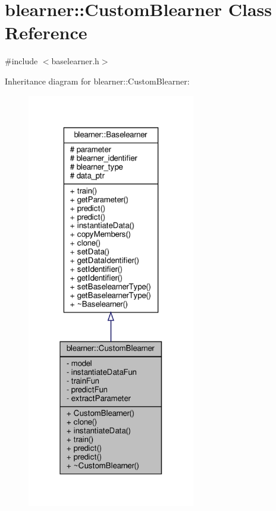 \hypertarget{classblearner_1_1_custom_blearner}{}\section{blearner\+:\+:Custom\+Blearner Class Reference}
\label{classblearner_1_1_custom_blearner}


{\ttfamily \#include $<$baselearner.\+h$>$}



Inheritance diagram for blearner\+:\+:Custom\+Blearner\+:\nopagebreak
\begin{figure}[H]
\begin{center}
\leavevmode
\includegraphics[width=208pt]{classblearner_1_1_custom_blearner__inherit__graph}
\end{center}
\end{figure}


